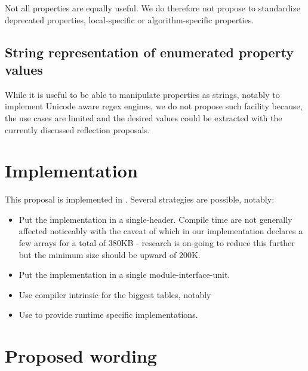 \documentclass{wg21}
\begin{document}
Not all properties are equally useful.
We do therefore not propose to standardize deprecated properties, local-specific or algorithm-specific properties.


\subsection{String representation of enumerated property values}

While it is useful to be able to manipulate properties as strings, notably to implement Unicode aware regex engines, we do not propose such facility because,
the use cases are limited and the desired values could be extracted with the currently discussed reflection proposals.

\section{Implementation}

This proposal is implemented in \cite{impl}.
Several strategies are possible, notably:
\begin{itemize}
    \item Put the implementation in a single-header. Compile time are not generally affected noticeably with the caveat of  which in our implementation declares a few arrays for a total of 380KB - research is on-going to reduce this further but the minimum size should be upward of 200K.
    \item Put the implementation in a single module-interface-unit.
    \item Use compiler intrinsic for the biggest tables, notably 
    \item Use  to provide runtime specific implementations.
\end{itemize}

\section{Proposed wording}
\end{document}
